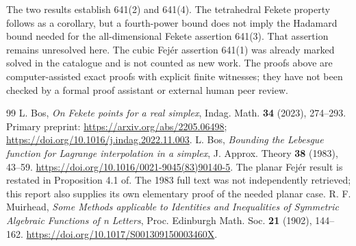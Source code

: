 \documentclass[11pt,a4paper]{article}
\theoremstyle{definition}
\theoremstyle{remark}
\numberwithin{equation}{section}
\begin{document}
The two results establish 641(2) and 641(4).  The tetrahedral Fekete
property follows as a corollary, but a fourth-power bound does not imply
the Hadamard bound needed for the all-dimensional Fekete assertion
641(3).  That assertion remains unresolved here.  The cubic Fej\'er
assertion 641(1) was already marked solved in the catalogue and is not
counted as new work.  The proofs above are computer-assisted exact
proofs with explicit finite witnesses; they have not been checked by a
formal proof assistant or external human peer review.

\begin{thebibliography}{99}
L. Bos, \emph{On Fekete points for a real simplex}, Indag. Math. \textbf{34} (2023), 274--293. Primary preprint: \url{https://arxiv.org/abs/2205.06498}; \url{https://doi.org/10.1016/j.indag.2022.11.003}.
L. Bos, \emph{Bounding the Lebesgue function for Lagrange interpolation in a simplex}, J. Approx. Theory \textbf{38} (1983), 43--59. \url{https://doi.org/10.1016/0021-9045(83)90140-5}. The planar Fej\'er result is restated in Proposition 4.1 of\cite{bos2023}. The 1983 full text was not independently retrieved; this report also supplies its own elementary proof of the needed planar case.
R. F. Muirhead, \emph{Some Methods applicable to Identities and Inequalities of Symmetric Algebraic Functions of n Letters}, Proc. Edinburgh Math. Soc. \textbf{21} (1902), 144--162. \url{https://doi.org/10.1017/S001309150003460X}.
\end{thebibliography}
\end{document}
